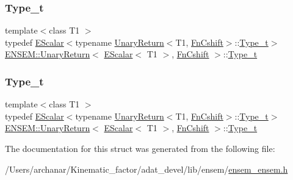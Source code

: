 \subsubsection{\texorpdfstring{Type\_t}{Type\_t}\hspace{0.1cm}{\footnotesize\ttfamily [1/2]}}
{\footnotesize\ttfamily template$<$class T1 $>$ \\
typedef \mbox{\hyperlink{classENSEM_1_1EScalar}{E\+Scalar}}$<$typename \mbox{\hyperlink{structENSEM_1_1UnaryReturn}{Unary\+Return}}$<$T1, \mbox{\hyperlink{structENSEM_1_1FnCshift}{Fn\+Cshift}}$>$\+::\mbox{\hyperlink{structENSEM_1_1UnaryReturn_3_01EScalar_3_01T1_01_4_00_01FnCshift_01_4_accaabe891d4db03e846c40927db5ad5e}{Type\+\_\+t}}$>$ \mbox{\hyperlink{structENSEM_1_1UnaryReturn}{E\+N\+S\+E\+M\+::\+Unary\+Return}}$<$ \mbox{\hyperlink{classENSEM_1_1EScalar}{E\+Scalar}}$<$ T1 $>$, \mbox{\hyperlink{structENSEM_1_1FnCshift}{Fn\+Cshift}} $>$\+::\mbox{\hyperlink{structENSEM_1_1UnaryReturn_3_01EScalar_3_01T1_01_4_00_01FnCshift_01_4_accaabe891d4db03e846c40927db5ad5e}{Type\+\_\+t}}}

\mbox{\label{structENSEM_1_1UnaryReturn_3_01EScalar_3_01T1_01_4_00_01FnCshift_01_4_accaabe891d4db03e846c40927db5ad5e}} 
\subsubsection{\texorpdfstring{Type\_t}{Type\_t}\hspace{0.1cm}{\footnotesize\ttfamily [2/2]}}
{\footnotesize\ttfamily template$<$class T1 $>$ \\
typedef \mbox{\hyperlink{classENSEM_1_1EScalar}{E\+Scalar}}$<$typename \mbox{\hyperlink{structENSEM_1_1UnaryReturn}{Unary\+Return}}$<$T1, \mbox{\hyperlink{structENSEM_1_1FnCshift}{Fn\+Cshift}}$>$\+::\mbox{\hyperlink{structENSEM_1_1UnaryReturn_3_01EScalar_3_01T1_01_4_00_01FnCshift_01_4_accaabe891d4db03e846c40927db5ad5e}{Type\+\_\+t}}$>$ \mbox{\hyperlink{structENSEM_1_1UnaryReturn}{E\+N\+S\+E\+M\+::\+Unary\+Return}}$<$ \mbox{\hyperlink{classENSEM_1_1EScalar}{E\+Scalar}}$<$ T1 $>$, \mbox{\hyperlink{structENSEM_1_1FnCshift}{Fn\+Cshift}} $>$\+::\mbox{\hyperlink{structENSEM_1_1UnaryReturn_3_01EScalar_3_01T1_01_4_00_01FnCshift_01_4_accaabe891d4db03e846c40927db5ad5e}{Type\+\_\+t}}}



The documentation for this struct was generated from the following file\+:\begin{DoxyCompactItemize}
\item 
/\+Users/archanar/\+Kinematic\+\_\+factor/adat\+\_\+devel/lib/ensem/\mbox{\hyperlink{lib_2ensem_2ensem__ensem_8h}{ensem\+\_\+ensem.\+h}}\end{DoxyCompactItemize}

